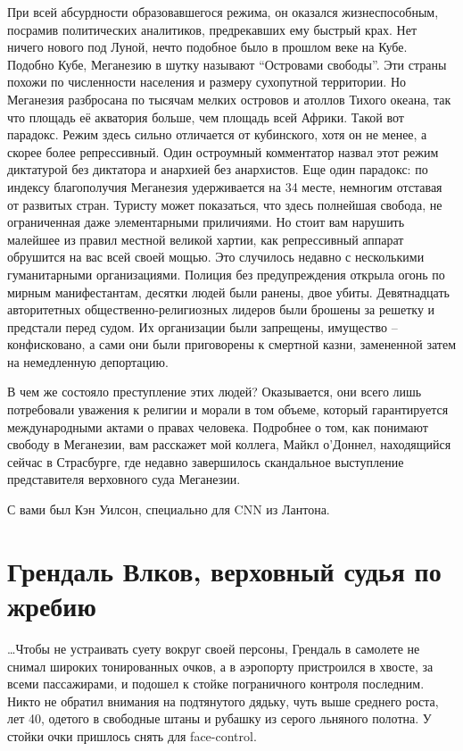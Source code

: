 \documentclass[10pt,final]{book}
\begin{document}
При всей абсурдности образовавшегося режима, он оказался жизнеспособным, посрамив политических аналитиков, предрекавших ему быстрый крах. Нет ничего нового под Луной, нечто подобное было в прошлом веке на Кубе. Подобно Кубе, Меганезию в шутку называют ``Островами свободы''. Эти страны похожи по численности населения и размеру сухопутной территории. Но Меганезия разбросана по тысячам мелких островов и атоллов Тихого океана, так что площадь её акватория больше, чем площадь всей Африки. Такой вот парадокс. Режим здесь сильно отличается от кубинского, хотя он не менее, а скорее более репрессивный. Один остроумный комментатор назвал этот режим диктатурой без диктатора и анархией без анархистов. Еще один парадокс: по индексу благополучия Меганезия удерживается на 34 месте, немногим отставая от развитых стран. Туристу может показаться, что здесь полнейшая свобода, не ограниченная даже элементарными приличиями. Но стоит вам нарушить малейшее из правил местной великой хартии, как репрессивный аппарат обрушится на вас всей своей мощью. Это случилось недавно с несколькими гуманитарными организациями. Полиция без предупреждения открыла огонь по мирным манифестантам, десятки людей были ранены, двое убиты. Девятнадцать авторитетных общественно-религиозных лидеров были брошены за решетку и предстали перед судом. Их организации были запрещены, имущество -- конфисковано, а сами они были приговорены к смертной казни, замененной затем на немедленную депортацию.

В чем же состояло преступление этих людей? Оказывается, они всего лишь потребовали уважения к религии и морали в том объеме, который гарантируется международными актами о правах человека. Подробнее о том, как понимают свободу в Меганезии, вам расскажет мой коллега, Майкл о’Доннел, находящийся сейчас в Страсбурге, где недавно завершилось скандальное выступление представителя верховного суда Меганезии.

С вами был Кэн Уилсон, специально для CNN из Лантона.

\chapter{Грендаль Влков, верховный судья по жребию}

\ldots{}Чтобы не устраивать суету вокруг своей персоны, Грендаль в самолете не снимал широких тонированных очков, а в аэропорту пристроился в хвосте, за всеми пассажирами, и подошел к стойке пограничного контроля последним. Никто не обратил внимания на подтянутого дядьку, чуть выше среднего роста, лет 40, одетого в свободные штаны и рубашку из серого льняного полотна. У стойки очки пришлось снять для face-control.
\end{document}
